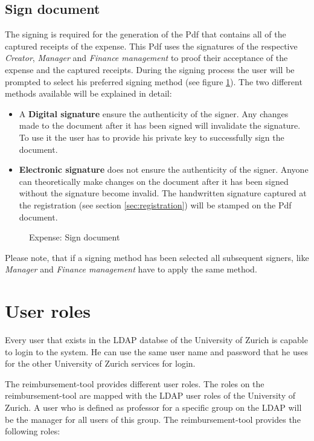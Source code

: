 \subsection{Sign document}
\label{sec:signing}
The signing is required for the generation of the Pdf that contains all of the captured receipts of the expense. This Pdf uses the signatures of the respective \textit{Creator}, \textit{Manager} and \textit{Finance management} to proof their acceptance of the expense and the captured receipts. During the signing process the user will be prompted to select his preferred signing method (see figure \ref{fig:expense-sign}). The two different methods available will be explained in detail:
\begin{itemize}
    \item A \textbf{Digital signature} ensure the authenticity of the signer. Any changes made to the document after it has been signed will invalidate the signature. To use it the user has to provide his private key to successfully sign the document.
    \item \textbf{Electronic signature} does not ensure the authenticity of the signer. Anyone can theoretically make changes on the document after it has been signed without the signature become invalid. The handwritten signature captured at the registration (see section \ref{sec:registration}) will be stamped on the Pdf document.
\end{itemize}

\begin{figure}[H]
    \centering
    \caption{Expense: Sign document}
    \label{fig:expense-sign}
\end{figure}

Please note, that if a signing method has been selected all subsequent signers, like \textit{Manager} and \textit{Finance management} have to apply the same method.


\section{User roles}
\label{user-roles}

Every user that exists in the LDAP databse of the University of Zurich is capable to login to the system. He can use the same user name and password that he uses for the other University of Zurich services for login.

The reimbursement-tool provides different user roles. The roles on the reimbursement-tool are mapped with the LDAP user roles of the University of Zurich. A user who is defined as professor for a specific group on the LDAP will be the manager for all users of this group. The reimbursement-tool provides the following roles:

